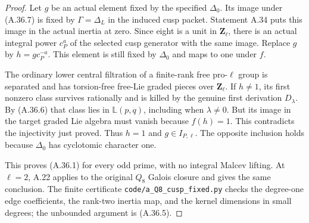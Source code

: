 \begin{proof}
Let \(g\) be an actual element fixed by the specified
\(\Delta_0\). Its image under (A.36.7) is fixed by
\(\Gamma=\Delta_L\) in the induced cusp packet.
Statement A.34 puts this image in the actual inertia
at zero. Since eight is a unit in \(\mathbf Z_\ell\),
there is an actual integral power \(c_P^a\) of the
selected cusp generator with the same image.
Replace \(g\) by \(h=g c_P^{-a}\).
This element is still fixed by \(\Delta_0\) and maps
to one under \(f\).

The ordinary lower central filtration of a finite-rank
free pro-\(\ell\) group is separated and has torsion-free
free-Lie graded pieces over \(\mathbf Z_\ell\).
If \(h\ne1\), its first nonzero class survives rationally
and is killed by the genuine first derivation
\(D_\lambda\). By (A.36.6) that class lies in
\(\mathbb L(p,q)\), including when \(\lambda\ne0\).
But its image in the target graded Lie algebra must
vanish because \(f(h)=1\). This contradicts the
injectivity just proved. Thus \(h=1\) and
\(g\in I_{P,\ell}\). The opposite inclusion holds
because \(\Delta_0\) has cyclotomic character one.

This proves (A.36.1) for every odd prime, with no
integral Malcev lifting. At \(\ell=2\), A.22 applies
to the original \(Q_8\) Galois closure and gives the
same conclusion. The finite certificate
\texttt{code/a\_Q8\_cusp\_fixed.py} checks the degree-one
edge coefficients, the rank-two inertia map, and the
kernel dimensions in small degrees; the unbounded
argument is (A.36.5).
\end{proof}

